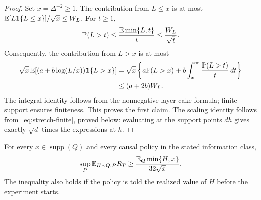 \begin{proof}
Set $x=\Delta^{-2}\ge1$. The contribution from $L\le x$ is at most
$\mathbb E[L\mathbf 1\{L\le x\}]/\sqrt x\le W_L$. For $t\ge1$,
\[
 \mathbb P(L>t)\le\frac{\mathbb E\min\{L,t\}}{t}
               \le\frac{W_L}{\sqrt t}.
\]
Consequently, the contribution from $L>x$ is at most
\begin{align*}
 \sqrt x\,\mathbb E[(a+b\log(L/x))\mathbf 1\{L>x\}]
 &=\sqrt x\left\{a\mathbb P(L>x)
             +b\int_x^\infty\frac{\mathbb P(L>t)}{t}\,dt\right\}\\
 &\le(a+2b)W_L.
\end{align*}
The integral identity follows from the nonnegative layer-cake
formula; finite support ensures finiteness. This proves the first
claim. The scaling identity follows from~\eqref{eq:stretch-finite},
proved below: evaluating at the support points $d h$ gives exactly
$\sqrt d$ times the expressions at $h$.
\end{proof}

\begin{lemma}
\label{lem:stretch-testing}
For every $x\in\operatorname{supp}(Q)$ and every causal policy in the
stated information class,
\begin{equation}
 \sup_P\mathbb E_{H\sim Q,P}R_T
      \ge\frac{\mathbb E_Q\min\{H,x\}}{32\sqrt x}.
 \label{eq:stretch-testing}
\end{equation}
The inequality also holds if the policy is told the realized value
of $H$ before the experiment starts.
\end{lemma}

